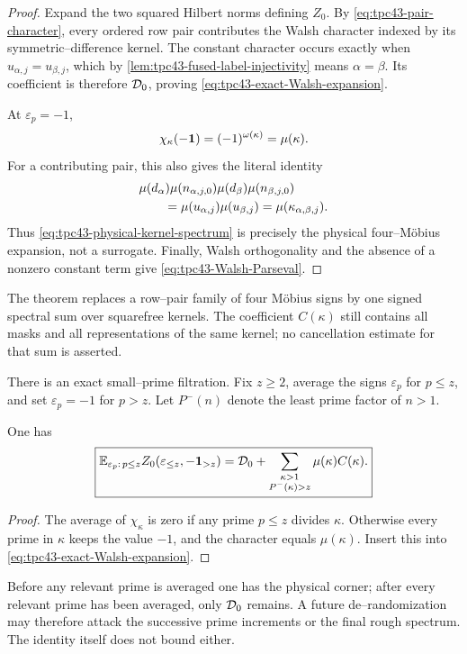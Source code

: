 \begin{proof}
Expand the two squared Hilbert norms defining \(Z_0\).  By
\eqref{eq:tpc43-pair-character}, every ordered row pair contributes the
Walsh character indexed by its symmetric--difference kernel.  The
constant character occurs exactly when
\(u_{\alpha,j}=u_{\beta,j}\), which by
\cref{lem:tpc43-fused-label-injectivity} means \(\alpha=\beta\).  Its
coefficient is therefore \(\mathcal D_0\), proving
\eqref{eq:tpc43-exact-Walsh-expansion}.

At \(\varepsilon_p=-1\),
\begin{equation}
 \chi_\kappa(-\mathbf 1)=(-1)^{\omega(\kappa)}=\mu(\kappa).
 \label{eq:tpc43-character-at-minus}
\end{equation}
For a contributing pair, this also gives the literal identity
\begin{align}
 &\mu(d_\alpha)\mu(n_{\alpha,j,0})
  \mu(d_\beta)\mu(n_{\beta,j,0})
 \notag\\
 &\qquad
 =\mu(u_{\alpha,j})\mu(u_{\beta,j})
 =\mu(\kappa_{\alpha,\beta,j}).
 \label{eq:tpc43-literal-four-to-one}
\end{align}
Thus \eqref{eq:tpc43-physical-kernel-spectrum} is precisely the physical
four--M\"obius expansion, not a surrogate.  Finally, Walsh orthogonality
and the absence of a nonzero constant term give
\eqref{eq:tpc43-Walsh-Parseval}.
\end{proof}

The theorem replaces a row--pair family of four M\"obius signs by one
signed spectral sum over squarefree kernels.  The coefficient
\(C(\kappa)\) still contains all masks and all representations of the
same kernel; no cancellation estimate for that sum is asserted.

There is an exact small--prime filtration.  Fix \(z\ge2\), average the
signs \(\varepsilon_p\) for \(p\le z\), and set
\(\varepsilon_p=-1\) for \(p>z\).  Let \(P^-(n)\) denote the least prime
factor of \(n>1\).

\begin{corollary}
\label{cor:tpc43-rough-kernel-filtration}
One has
\begin{equation}
 \boxed{
 \mathbb E_{\varepsilon_p:\,p\le z}
 Z_0(\varepsilon_{\le z},-\mathbf 1_{>z})
 =\mathcal D_0+
  \sum_{\substack{\kappa>1\\P^-(\kappa)>z}}
  \mu(\kappa)C(\kappa).}
 \label{eq:tpc43-rough-filtration}
\end{equation}
\end{corollary}

\begin{proof}
The average of \(\chi_\kappa\) is zero if any prime
\(p\le z\) divides \(\kappa\).  Otherwise every prime in \(\kappa\)
keeps the value \(-1\), and the character equals \(\mu(\kappa)\).
Insert this into \eqref{eq:tpc43-exact-Walsh-expansion}.
\end{proof}

Before any relevant prime is averaged one has the physical corner;
after every relevant prime has been averaged, only \(\mathcal D_0\) remains.
A future
de--randomization may therefore attack the successive prime increments
or the final rough spectrum.  The identity itself does not bound either.
